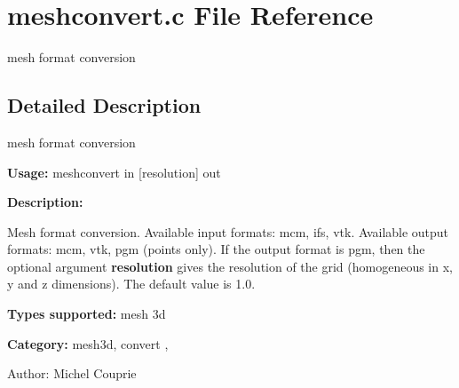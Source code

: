 \section{meshconvert.c File Reference}
\label{meshconvert_8c}
mesh format conversion 



\subsection{Detailed Description}
mesh format conversion 

{\bf Usage:} meshconvert in [resolution] out

{\bf Description:}

Mesh format conversion. Available input formats: mcm, ifs, vtk. Available output formats: mcm, vtk, pgm (points only). If the output format is pgm, then the optional argument {\bf resolution} gives the resolution of the grid (homogeneous in x, y and z dimensions). The default value is 1.0.

{\bf Types supported:} mesh 3d

{\bf Category:} mesh3d, convert ,

\begin{Desc}
\item[Author:]Michel Couprie \end{Desc}

